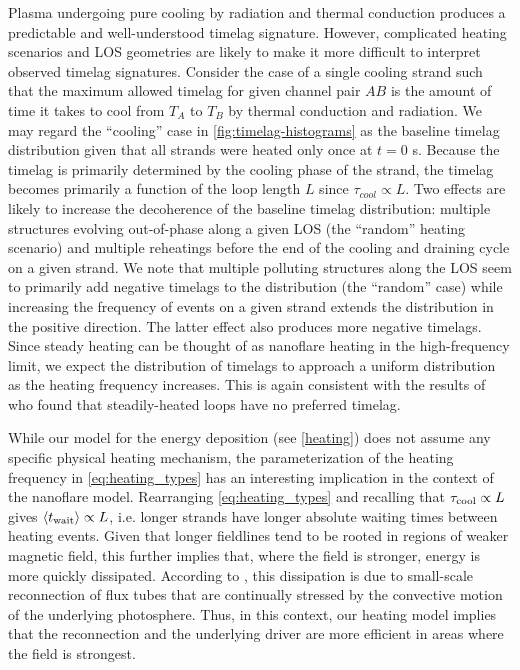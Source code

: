 Plasma undergoing pure cooling by radiation and thermal conduction produces a predictable and well-understood timelag signature. However, complicated heating scenarios and LOS geometries are likely to make it more difficult to interpret observed timelag signatures. Consider the case of a single cooling strand such that the maximum allowed timelag for given channel pair $AB$ is the amount of time it takes to cool from $T_A$ to $T_B$ by thermal conduction and radiation. We may regard the ``cooling'' case in \autoref{fig:timelag-histograms} as the baseline timelag distribution given that all strands were heated only once at $t=0$ s. Because the timelag is primarily determined by the cooling phase of the strand, the timelag becomes primarily a function of the loop length $L$ since $\tau_{cool}\propto L$. Two effects are likely to increase the decoherence of the baseline timelag distribution: multiple structures evolving out-of-phase along a given LOS (the ``random'' heating scenario) and multiple reheatings before the end of the cooling and draining cycle on a given strand. We note that multiple polluting structures along the LOS seem to primarily add negative timelags to the distribution (the ``random'' case) while increasing the frequency of events on a given strand extends the distribution in the positive direction. The latter effect also produces more negative timelags. Since steady heating can be thought of as nanoflare heating in the high-frequency limit, we expect the distribution of timelags to approach a uniform distribution as the heating frequency increases. This is again consistent with the results of \citet{viall_signatures_2016} who found that steadily-heated loops have no preferred timelag.

While our model for the energy deposition (see \autoref{heating}) does not assume any specific physical heating mechanism, the parameterization of the heating frequency in \autoref{eq:heating_types} has an interesting implication in the context of the \citet{parker_nanoflares_1988} nanoflare model. Rearranging \autoref{eq:heating_types} and recalling that $\tau_\textup{cool}\propto L$ gives $\langle t_{\textup{wait}}\rangle\propto L$, i.e. longer strands have longer absolute waiting times between heating events. Given that longer fieldlines tend to be rooted in regions of weaker magnetic field, this further implies that, where the field is stronger, energy is more quickly dissipated. According to \citet{parker_nanoflares_1988}, this dissipation is due to small-scale reconnection of flux tubes that are continually stressed by the convective motion of the underlying photosphere. Thus, in this context, our heating model implies that the reconnection and the underlying driver are more efficient in areas where the field is strongest.


